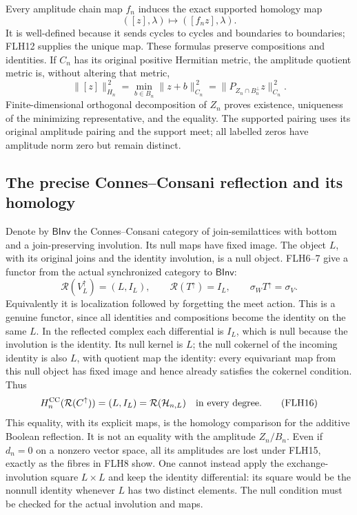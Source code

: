 Every amplitude chain map \(f_n\) induces the exact supported
homology map
\[
([z],\lambda)\longmapsto([f_nz],\lambda).
\tag{FLH13}
\]
It is well-defined because it sends cycles to cycles and
boundaries to boundaries; FLH12 supplies the unique map.
These formulas preserve compositions and identities.
If \(C_n\) has its original positive Hermitian metric, the
amplitude quotient metric is, without altering that metric,
\[
\|[z]\|_{H_n}^{\,2}
 =\min_{b\in B_n}\|z+b\|_{C_n}^{\,2}
 =\|P_{Z_n\cap B_n^\perp}z\|_{C_n}^{\,2}.
\tag{FLH14}
\]
Finite-dimensional orthogonal decomposition of \(Z_n\) proves
existence, uniqueness of the minimizing representative, and
the equality. The supported pairing uses its original amplitude
pairing and the support meet; all labelled zeros have amplitude
norm zero but remain distinct.

\subsection{The precise Connes--Consani reflection and its homology}

Denote by \(\mathsf{BInv}\) the Connes--Consani category of
join-semilattices with bottom and a join-preserving involution.
Its null maps have fixed image. The object \(L\), with its
original joins and the identity involution, is a null object.
FLH6--7 give a functor from the actual synchronized category
to \(\mathsf{BInv}\):
\[
\mathcal R(V_L^\uparrow)=(L,I_L),\qquad
\mathcal R(T^\uparrow)=I_L,\qquad
\sigma_WT^\uparrow=\sigma_V .
\tag{FLH15}
\]
Equivalently it is localization followed by forgetting the
meet action. This is a genuine functor, since all identities
and compositions become the identity on the same \(L\).
In the reflected complex each differential is \(I_L\),
which is null because the involution is the identity.
Its null kernel is \(L\); the null cokernel of the incoming
identity is also \(L\), with quotient map the identity:
every equivariant map from this null object has fixed image
and hence already satisfies the cokernel condition. Thus
\[
H_n^{\rm CC}(\mathcal R(C^\uparrow))=(L,I_L)
 =\mathcal R(\mathcal H_{n,L})
\quad\text{in every degree}.
\tag{FLH16}
\]
This equality, with its explicit maps, is the homology
comparison for the additive Boolean reflection.
It is not an equality with the amplitude \(Z_n/B_n\).
Even if \(d_n=0\) on a nonzero vector space, all its amplitudes
are lost under FLH15, exactly as the fibres in FLH8 show.
One cannot instead apply the exchange-involution square
\(L\times L\) and keep the identity differential: its square
would be the nonnull identity whenever \(L\) has two distinct
elements. The null condition must be checked for the actual
involution and maps.

